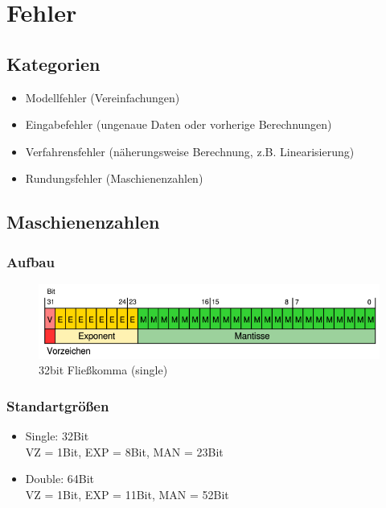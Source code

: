 \section{Fehler}

\subsection{Kategorien}
\begin{itemize}

	\item Modellfehler (Vereinfachungen)
	
	\item Eingabefehler (ungenaue Daten oder vorherige Berechnungen)
	
	\item Verfahrensfehler (näherungsweise Berechnung, z.B. Linearisierung)
	
	\item Rundungsfehler (Maschienenzahlen)

\end{itemize}

\subsection{Maschienenzahlen}

\subsubsection*{Aufbau}
\begin{figure}[h!]
	\includegraphics[width=\linewidth]{pics/floatingpoint}
	\caption{32bit Fließkomma (single)}
\end{figure}

\subsubsection*{Standartgrößen}
\begin{itemize}

	\item Single: 32Bit \\
	VZ = 1Bit, EXP = 8Bit, MAN = 23Bit
	
	\item Double: 64Bit \\
	VZ = 1Bit, EXP = 11Bit, MAN = 52Bit

\end{itemize}

